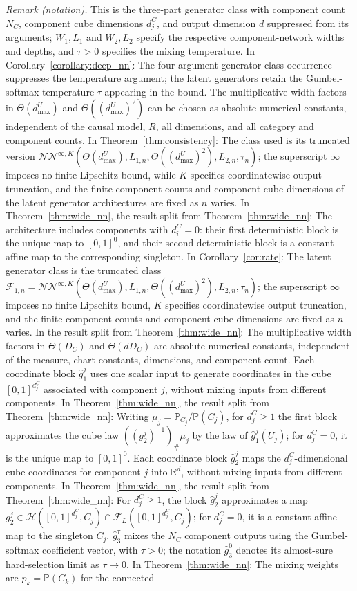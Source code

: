 \noindent\textit{Remark (notation).} This is the three-part generator class with component count $N_C$, component cube dimensions $d_j^C$, and output dimension $d$ suppressed from its arguments; $W_1,L_1$ and $W_2,L_2$ specify the respective component-network widths and depths, and $\tau>0$ specifies the mixing temperature. In Corollary~\ref{corollary:deep_nn}: The four-argument generator-class occurrence suppresses the temperature argument; the latent generators retain the Gumbel-softmax temperature $\tau$ appearing in the bound. The multiplicative width factors in $\Theta(d_{\max}^U)$ and $\Theta((d_{\max}^U)^2)$ can be chosen as absolute numerical constants, independent of the causal model, $R$, all dimensions, and all category and component counts. In Theorem~\ref{thm:consistency}: The class used is its truncated version $\mathcal{NN}^{\infty,K}(\Theta(d_{\max}^U),L_{1,n},\Theta((d_{\max}^U)^2),L_{2,n},\tau_n)$; the superscript $\infty$ imposes no finite Lipschitz bound, while $K$ specifies coordinatewise output truncation, and the finite component counts and component cube dimensions of the latent generator architectures are fixed as $n$ varies. In Theorem~\ref{thm:wide_nn}, the result split from Theorem~\ref{thm:wide_nn}: The architecture includes components with $d_i^C=0$: their first deterministic block is the unique map to $[0,1]^0$, and their second deterministic block is a constant affine map to the corresponding singleton. In Corollary~\ref{cor:rate}: The latent generator class is the truncated class $\mathcal F_{1,n}=\mathcal{NN}^{\infty,K}(\Theta(d_{\max}^U),L_{1,n},\Theta((d_{\max}^U)^2),L_{2,n},\tau_n)$; the superscript $\infty$ imposes no finite Lipschitz bound, $K$ specifies coordinatewise output truncation, and the finite component counts and component cube dimensions are fixed as $n$ varies. In the result split from Theorem~\ref{thm:wide_nn}: The multiplicative width factors in $\Theta(D_C)$ and $\Theta(dD_C)$ are absolute numerical constants, independent of the measure, chart constants, dimensions, and component count. Each coordinate block $\hat{g}_1^j$ uses one scalar input to generate coordinates in the cube $[0,1]^{d_j^C}$ associated with component $j$, without mixing inputs from different components. In Theorem~\ref{thm:wide_nn}, the result split from Theorem~\ref{thm:wide_nn}: Writing $\mu_j=\mathbb{P}_{C_j}/\mathbb{P}(C_j)$, for $d_j^C\geqslant1$ the first block approximates the cube law $((g_2^j)^{-1})_{\#}\mu_j$ by the law of $\hat{g}_1^j(U_j)$; for $d_j^C=0$, it is the unique map to $[0,1]^0$. Each coordinate block $\hat{g}_2^j$ maps the $d_j^C$-dimensional cube coordinates for component $j$ into $\mathbb{R}^d$, without mixing inputs from different components. In Theorem~\ref{thm:wide_nn}, the result split from Theorem~\ref{thm:wide_nn}: For $d_j^C\geqslant1$, the block $\hat{g}_2^j$ approximates a map $g_2^j\in\mathcal{H}([0,1]^{d_j^C},C_j)\cap\mathcal{F}_L([0,1]^{d_j^C},C_j)$; for $d_j^C=0$, it is a constant affine map to the singleton $C_j$. $\hat{g}_3^\tau$ mixes the $N_C$ component outputs using the Gumbel-softmax coefficient vector, with $\tau>0$; the notation $\hat{g}_3^0$ denotes its almost-sure hard-selection limit as $\tau\rightarrow0$. In Theorem~\ref{thm:wide_nn}: The mixing weights are $p_k=\mathbb{P}(C_k)$ for the connected 